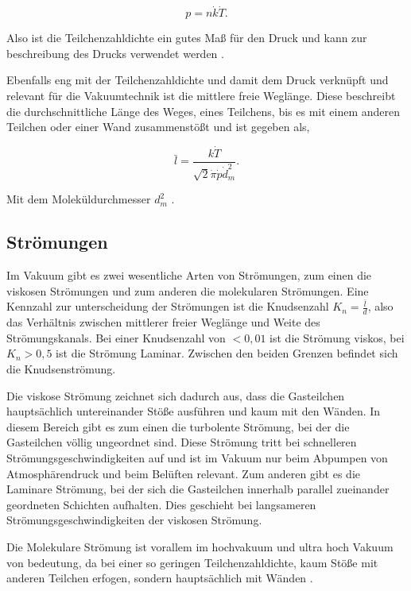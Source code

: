     \begin{equation}
    \label{equ:2}
        p = n \dot k \dot T.
    \end{equation}

Also ist die Teilchenzahldichte ein gutes Maß für den Druck und kann zur beschreibung des Drucks verwendet werden \cite{Pfeiffer, S.11}.

Ebenfalls eng mit der Teilchenzahldichte und damit dem Druck verknüpft und relevant für die Vakuumtechnik ist die mittlere freie Weglänge.
Diese beschreibt die durchschnittliche Länge des Weges, eines Teilchens, bis es mit einem anderen Teilchen oder einer Wand zusammenstößt 
und ist gegeben als,

\begin{equation}
\label{equ:3}
    \bar{l} = \frac{k \dot T}{\sqrt{2} \dot \pi \dot p \dot d_m^2}.
\end{equation}

Mit dem Moleküldurchmesser $d_m^2$ \cite{Pfeiffer, S.12}.


\subsection{Strömungen}
\label{sec:Strömungen}
Im Vakuum gibt es zwei wesentliche Arten von Strömungen, zum einen die viskosen Strömungen und zum anderen die molekularen Strömungen.
Eine Kennzahl zur unterscheidung der Strömungen ist die Knudsenzahl $K_n = \frac{\bar{l}}{d}$, also das Verhältnis zwischen mittlerer freier Weglänge 
und Weite des Strömungskanals.
Bei einer Knudsenzahl von $< 0,01$ ist die Strömung viskos, bei $K_n > 0,5$ ist die Strömung Laminar. Zwischen den beiden Grenzen befindet sich die 
Knudsenströmung.

Die viskose Strömung zeichnet sich dadurch aus, dass die Gasteilchen hauptsächlich untereinander Stöße ausführen und kaum mit den Wänden.
In diesem Bereich gibt es zum einen die turbolente Strömung, bei der die Gasteilchen völlig ungeordnet sind. Diese Strömung tritt bei schnelleren 
Strömungsgeschwindigkeiten auf und ist im Vakuum nur beim Abpumpen von Atmosphärendruck und beim Belüften relevant.
Zum anderen gibt es die Laminare Strömung, bei der sich die Gasteilchen innerhalb parallel zueinander geordneten Schichten aufhalten.
Dies geschieht bei langsameren Strömungsgeschwindigkeiten der viskosen Strömung.

Die Molekulare Strömung ist vorallem im hochvakuum und ultra hoch Vakuum von bedeutung, da bei einer so geringen Teilchenzahldichte, kaum Stöße mit anderen Teilchen erfogen, 
sondern hauptsächlich mit Wänden \cite{Pfeiffer, S.14,15}.


